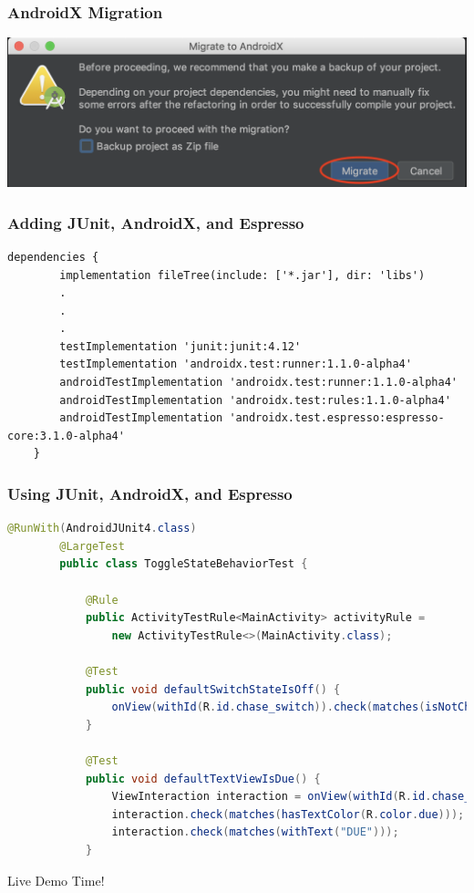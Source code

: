 \documentclass[10pt]{beamer}
\begin{document}
\begin{frame}
    \frametitle{AndroidX Migration}
    \center\includegraphics[scale=0.5]{androidx_step2}
\end{frame}

\begin{frame}[fragile]
\frametitle{Adding JUnit, AndroidX, and Espresso}
\begin{lstlisting}[caption={build.gradle}]
    dependencies {
        implementation fileTree(include: ['*.jar'], dir: 'libs')
        .
        .
        .
        testImplementation 'junit:junit:4.12'
        testImplementation 'androidx.test:runner:1.1.0-alpha4'
        androidTestImplementation 'androidx.test:runner:1.1.0-alpha4'
        androidTestImplementation 'androidx.test:rules:1.1.0-alpha4'
        androidTestImplementation 'androidx.test.espresso:espresso-core:3.1.0-alpha4'
    }
\end{lstlisting}
\end{frame}

\begin{frame}[fragile]
    \frametitle{Using JUnit, AndroidX, and Espresso}
    \begin{lstlisting}[language=java, caption={ToggleStateBehaviorTest.java}]
        @RunWith(AndroidJUnit4.class)
        @LargeTest
        public class ToggleStateBehaviorTest {

            @Rule
            public ActivityTestRule<MainActivity> activityRule =
                new ActivityTestRule<>(MainActivity.class);

            @Test
            public void defaultSwitchStateIsOff() {
                onView(withId(R.id.chase_switch)).check(matches(isNotChecked()));
            }

            @Test
            public void defaultTextViewIsDue() {
                ViewInteraction interaction = onView(withId(R.id.chase_text_view));
                interaction.check(matches(hasTextColor(R.color.due)));
                interaction.check(matches(withText("DUE")));
            }
    \end{lstlisting}
    Live Demo Time!
\end{frame}
\end{document}
